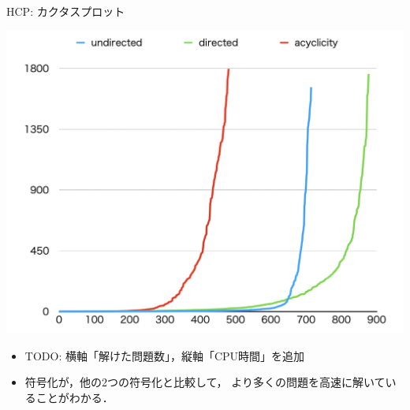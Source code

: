\documentclass[dvipdfmx]{beamer}
\begin{document}
\begin{frame}{HCP: カクタスプロット}

\begin{center}
  \includegraphics[width=0.7\linewidth]{fig/cactus.png}
\end{center}

\begin{itemize}
\item \alert{TODO: 横軸「解けた問題数」，縦軸「CPU時間」を追加}
\item {} 符号化が，他の2つの符号化と比較して，
  より多くの問題を高速に解いていることがわかる．
\end{itemize}
\end{frame}
\end{document}
